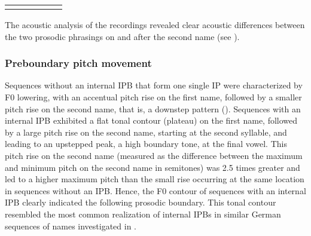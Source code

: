 \documentclass[output=paper]{langscibook}
\begin{document}
\begin{table}
{\begin{tabular}{lccccc}
\lspbottomrule
\end{tabular}}
 \end{table}
The acoustic analysis of the recordings revealed clear acoustic differences between the two prosodic phrasings on and after the second name (see ).
\clearpage
\subsubsection{Preboundary pitch movement} 
Sequences without an internal IPB that form one single IP were characterized by F0 lowering, with an accentual pitch rise on the first name, followed by a smaller pitch rise on the second name, that is, a downstep pattern (\citealt{Truckenbrodt2007b}). Sequences with an internal IPB exhibited a flat tonal contour (plateau) on the first name, followed by a large pitch rise on the second name, starting at the second syllable, and leading to an upstepped peak, a high boundary tone, at the final vowel. This pitch rise on the second name (measured as the difference between the maximum and minimum pitch on the second name in semitones) was 2.5 times greater and led to a higher maximum pitch than the small rise occurring at the same location in sequences without an IPB. Hence, the F0 contour of sequences with an internal IPB clearly indicated the following prosodic boundary. This tonal contour resembled the most common realization of internal IPBs in similar German sequences of names investigated in \citet{Petrone2017}.
\end{document}
